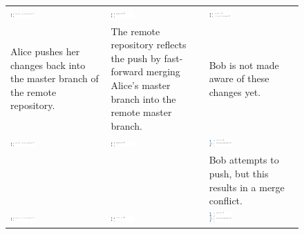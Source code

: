\begin{figure}[htbp]
\begin{tabulary}{\textwidth}{LLL}
    \includegraphics[width=0.27\textwidth]{Figures/background/foxtrot/alice_2.png} &
    \includegraphics[width=0.27\textwidth]{Figures/background/foxtrot/origin_2.png} &
    \includegraphics[width=0.27\textwidth]{Figures/background/foxtrot/bob_2.png} \\

    \tiny{Alice pushes her changes back into the master branch of the remote
    repository.} &
    \tiny{The remote repository reflects the push by fast-forward merging
    Alice's master branch into the remote master branch.} &
    \tiny{Bob is not made aware of these changes yet.} \\



    \includegraphics[width=0.27\textwidth]{Figures/background/foxtrot/alice_2.png} &
    \includegraphics[width=0.27\textwidth]{Figures/background/foxtrot/origin_2.png} &
    \includegraphics[width=0.27\textwidth]{Figures/background/foxtrot/bob_3.png} \\

    &
    &
    \tiny{Bob attempts to push, but this results in a merge conflict.}
    \\

    \includegraphics[width=0.27\textwidth]{Figures/background/foxtrot/alice_2.png} &
    \includegraphics[width=0.27\textwidth]{Figures/background/foxtrot/origin_2.png} &
    \includegraphics[width=0.27\textwidth]{Figures/background/foxtrot/bob_4.png} \\


\end{tabulary}
\end{figure}
